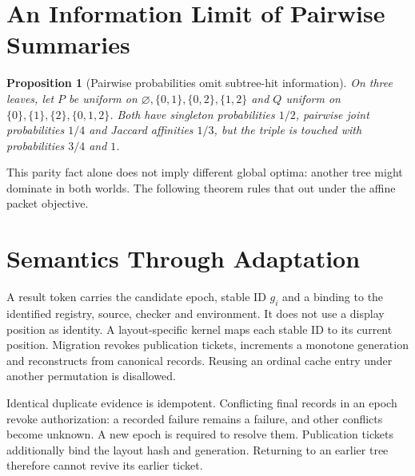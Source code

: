 \documentclass[10pt,journal,compsoc]{IEEEtran}
\newtheorem{proposition}[theorem]{Proposition}
\theoremstyle{definition}\newtheorem{definition}[theorem]{Definition}
\begin{document}
\section{An Information Limit of Pairwise Summaries}
\begin{proposition}[Pairwise probabilities omit subtree-hit information]\label{prop:pairwise}
On three leaves, let $P$ be uniform on
$\varnothing,\{0,1\},\{0,2\},\{1,2\}$ and $Q$ uniform on
$\{0\},\{1\},\{2\},\{0,1,2\}$. Both have singleton probabilities $1/2$,
pairwise joint probabilities $1/4$ and Jaccard affinities $1/3$, but the
triple is touched with probabilities $3/4$ and $1$.
\end{proposition}
This parity fact alone does not imply different global optima: another tree
might dominate in both worlds. The following theorem rules that out under
the affine packet objective.




\section{Semantics Through Adaptation}\label{sec:jsafety}
A result token carries the candidate epoch, stable ID $g_i$ and a binding
to the identified registry, source, checker and environment. It does not use
a display position as identity. A layout-specific kernel maps each stable
ID to its current position. Migration revokes publication tickets,
increments a monotone generation and reconstructs from canonical records.
Reusing an ordinal cache entry under another permutation is disallowed.

Identical duplicate evidence is idempotent. Conflicting final records in an
epoch revoke authorization: a recorded failure remains a failure, and other
conflicts become unknown. A new epoch is required to resolve them.
Publication tickets additionally bind the layout hash and generation.
Returning to an earlier tree therefore cannot revive its earlier ticket.
\end{document}
